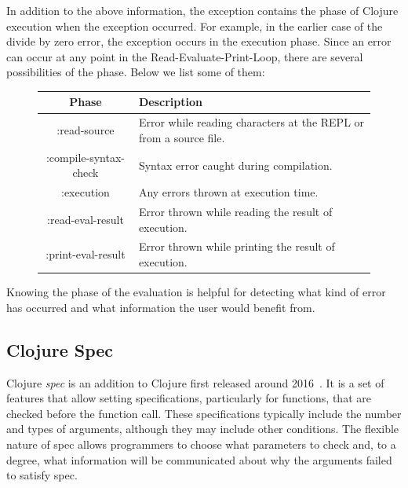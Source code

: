 \documentclass[12pt]{article}
\newcommand{\comment}[1]{{\bf \tt  {#1}}}
\newcommand{\emcomment}[1]{\textcolor{ForestGreen}{\comment{Elena: {#1}}}}
\newcommand{\tkcomment}[1]{\textcolor{Teal}{\comment{Tristan: {#1}}}}
\begin{document}
In addition to the above information, the exception contains the phase of Clojure execution when the exception occurred. For example, in the earlier case of the divide by zero error, the exception occurs in the execution phase. 
%
%
Since an error can occur at any point in the Read-Evaluate-Print-Loop, there are several possibilities of the phase. Below we list some of them:
	\begin{figure}[h]
		\centering
		\begin{tabular}{|c|l|}
			\hline
			\textbf{Phase} & \textbf{Description} \\
			\hline
			:read-source & Error while reading characters at the REPL or from a source file. \\
			:compile-syntax-check & Syntax error caught during compilation. \\
			:execution & Any errors thrown at execution time. \\
			:read-eval-result & Error thrown while reading the result of execution. \\
			:print-eval-result & Error thrown while printing the result of execution. \\
			\hline
		\end{tabular}
	\end{figure}

Knowing the phase of the evaluation is helpful for detecting what kind of error has occurred and what information the user would benefit from.


\subsection{Clojure Spec}\label{subsec:spec}
Clojure \textit{spec} is an addition to Clojure first released around 2016~\cite{spec-overview}.
It is a set of features that allow setting specifications, particularly for functions, that are checked before the function call. 
These specifications typically include the number and types of arguments, although they may include other conditions.
The flexible nature of spec allows programmers to choose what parameters to check and, to a degree, what information will be communicated about why the arguments failed to satisfy spec.
\end{document}

